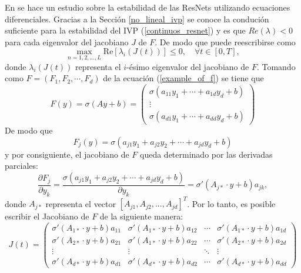En \cite{stable_resnets} se hace un estudio sobre la estabilidad de las ResNets utilizando ecuaciones diferenciales. Gracias a la Sección \ref{no_lineal_ivp} se conoce la condución suficiente para la estabilidad del IVP (\ref{continuos_resnet}) y es que $Re(\lambda) < 0$ para cada eigenvalor del jacobiano $J$ de $F$. De modo que puede reescribirse como 
\begin{equation}
   \label{stability_criteria}
   \max_{n=1,2, ..., L} \text{Re}[\lambda_i(J(t))] \leq 0, \quad \forall t\in [0,T],
\end{equation}  
donde $\lambda_i(J(t))$ representa el $i$-ésimo eigenvalor del jacobiano de $F$. Tomando como $F = (F_1, F_2, \cdots, F_d)$ de la ecuación (\ref{example_of_f}) se tiene que 
\begin{equation}
   F(y) =  \sigma(Ay+ b)=
   \left(\begin{matrix}
      \sigma(a_{11}y_1 + \cdots + a_{1d}y_d + b)\\
      \vdots  \\
      \sigma(a_{d1}y_1 + \cdots + a_{dd}y_d  + b)
   \end{matrix} \right)
\end{equation}
De modo que 
\begin{equation}
   F_j(y) = \sigma(a_{j1}y_1 + a_{j2}y_2 + \cdots + a_{jd}y_d + b)
\end{equation}
y por consiguiente, el jacobiano de $F$ queda determinado por las derivadas parciales:
\begin{equation}
   \frac{\partial F_j}{\partial y_k} = \frac{\sigma(a_{j1}y_1 + a_{j2}y_2 + \cdots + a_{jd}y_d + b)}{\partial y_k} = \sigma'(A_{j*}\cdot y+b)a_{jk},
\end{equation}
donde $A_{j*}$ representa el vector $[A_{j1}, A_{j2}, ...,A_{jd}]^T$. Por lo tanto, es posible escribir el Jacobiano de $F$ de la siguiente manera:
\begin{equation}
   J(t) = \left(\begin{matrix}
      \sigma'(A_{1*}\cdot y+b)a_{11} & \sigma'(A_{1*}\cdot y+b)a_{12} &\cdots & \sigma'(A_{1*}\cdot y+b)a_{1d}\\
      \sigma'(A_{2*}\cdot y+b)a_{21} & \sigma'(A_{1*}\cdot y+b)a_{22} &\cdots & \sigma'(A_{2*}\cdot y+b)a_{2d}\\
      \vdots & \vdots & \ddots & \vdots \\
      \sigma'(A_{d*}\cdot y+b)a_{d1} & \sigma'(A_{d*}\cdot y+b)a_{d2} &\cdots & \sigma'(A_{d*}\cdot y+b)a_{dd}
   \end{matrix} \right)
\end{equation}
